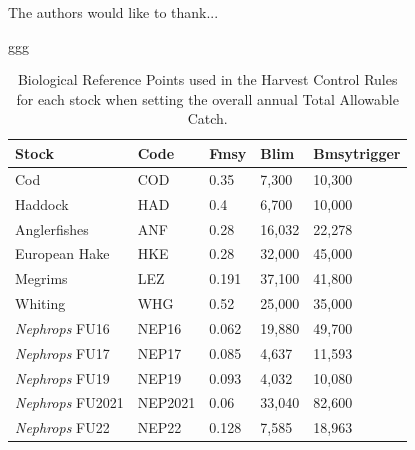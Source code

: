 \documentclass[12pt, halfline, a4paper]{ouparticle}
\begin{document}
\begin{notes}[Acknowledgements]
The authors would like to thank...
\end{notes}

\begin{thebibliography}
ggg
\end{thebibliography}

\clearpage

\begin{table}
	\center
	\begin{tabular}{p{4cm} p{3cm} p{2cm} p{2cm} p{2cm}}
		\toprule
		Stock & Code & Fmsy & Blim & Bmsytrigger \\
		\hline
		Cod & COD & 0.35 & 7,300  & 10,300 \\
		Haddock & HAD & 0.4 & 6,700 & 10,000 \\
		Anglerfishes & ANF & 0.28 & 16,032 & 22,278 \\
		European Hake & HKE & 0.28 & 32,000 & 45,000 \\
		Megrims & LEZ & 0.191 & 37,100 & 41,800 \\
		Whiting & WHG & 0.52 & 25,000 & 35,000 \\
		\textit{Nephrops} FU16 & NEP16 & 0.062 & 19,880 & 49,700 \\
		\textit{Nephrops} FU17 & NEP17 & 0.085 & 4,637 & 11,593 \\
	        \textit{Nephrops} FU19 & NEP19 & 0.093 & 4,032 & 10,080 \\
		\textit{Nephrops} FU2021 & NEP2021 & 0.06 & 33,040 & 82,600 \\
		\textit{Nephrops} FU22 & NEP22 & 0.128 & 7,585 & 18,963 \\
		\bottomrule
	\end{tabular}
	\label{tab:brp}
	\caption{Biological Reference Points used in the Harvest Control Rules for each
		stock when setting the overall annual Total Allowable Catch.}
\end{table}

\clearpage
\end{document}
